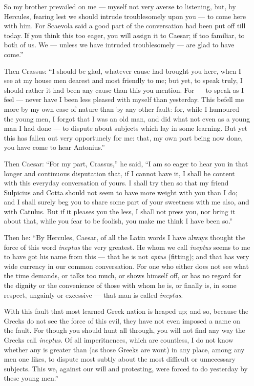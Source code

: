 So my brother prevailed on me — myself not very averse to listening, but, by Hercules, fearing lest we should intrude troublesomely upon you — to come here with him. For Scaevola said a good part of the conversation had been put off till today. If you think this too eager, you will assign it to Caesar; if too familiar, to both of us. We — unless we have intruded troublesomely — are glad to have come.''

 Then Crassus: ``I should be glad, whatever cause had brought you here, when I see at my house men dearest and most friendly to me; but yet, to speak truly, I should rather it had been any cause than this you mention. For — to speak as I feel — never have I been less pleased with myself than yesterday. This befell me more by my own ease of nature than by any other fault: for, while I humoured the young men, I forgot that I was an old man, and did what not even as a young man I had done — to dispute about subjects which lay in some learning. But yet this has fallen out very opportunely for me: that, my own part being now done, you have come to hear Antonius.''

 Then Caesar: ``For my part, Crassus,'' he said, ``I am so eager to hear you in that longer and continuous disputation that, if I cannot have it, I shall be content with this everyday conversation of yours. I shall try then so that my friend Sulpicius and Cotta should not seem to have more weight with you than I do; and I shall surely beg you to share some part of your sweetness with me also, and with Catulus. But if it pleases you the less, I shall not press you, nor bring it about that, while you fear to be foolish, you make me think I have been so.''

 Then he: ``By Hercules, Caesar, of all the Latin words I have always thought the force of this word \textit{ineptus} the very greatest. He whom we call \textit{ineptus} seems to me to have got his name from this — that he is not \textit{aptus} (fitting); and that has very wide currency in our common conversation. For one who either does not see what the time demands, or talks too much, or shows himself off, or has no regard for the dignity or the convenience of those with whom he is, or finally is, in some respect, ungainly or excessive — that man is called \textit{ineptus}.

 With this fault that most learned Greek nation is heaped up; and so, because the Greeks do not see the force of this evil, they have not even imposed a name on the fault. For though you should hunt all through, you will not find any way the Greeks call \textit{ineptus}. Of all imperitnences, which are countless, I do not know whether any is greater than (as those Greeks are wont) in any place, among any men one likes, to dispute most subtly about the most difficult or unnecessary subjects. This we, against our will and protesting, were forced to do yesterday by these young men.''

